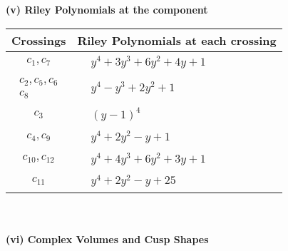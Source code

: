 \documentclass[1p]{elsarticle_modified}
\theoremstyle{definition}
\begin{document}
\newpage\renewcommand{\arraystretch}{1}
\flushleft \textbf{(v) Riley Polynomials at the component}\newline \\
\begin{tabular}{m{50pt}|m{274pt}}
Crossings & \hspace{64pt}Riley Polynomials at each crossing \\
\hline $$\begin{aligned}c_{1},c_{7}\end{aligned}$$&$\begin{aligned}
&y^4+3 y^3+6 y^2+4 y+1
\end{aligned}$\\
\hline $$\begin{aligned}c_{2},c_{5},c_{6}\\c_{8}\end{aligned}$$&$\begin{aligned}
&y^4- y^3+2 y^2+1
\end{aligned}$\\
\hline $$\begin{aligned}c_{3}\end{aligned}$$&$\begin{aligned}
&(y-1)^4
\end{aligned}$\\
\hline $$\begin{aligned}c_{4},c_{9}\end{aligned}$$&$\begin{aligned}
&y^4+2 y^2- y+1
\end{aligned}$\\
\hline $$\begin{aligned}c_{10},c_{12}\end{aligned}$$&$\begin{aligned}
&y^4+4 y^3+6 y^2+3 y+1
\end{aligned}$\\
\hline $$\begin{aligned}c_{11}\end{aligned}$$&$\begin{aligned}
&y^4+2 y^2- y+25
\end{aligned}$\\
\hline
\end{tabular}\\~\\
\newpage\flushleft \textbf{(vi) Complex Volumes and Cusp Shapes}
\end{document}
